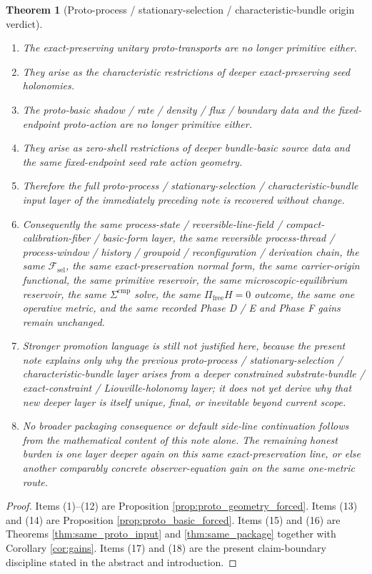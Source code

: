 \documentclass[11pt]{article}
\newcommand{\StemFunctional}{\mathscr F_{\mathrm{sel}}}
\newtheorem{theorem}{Theorem}
\begin{document}
\begin{theorem}[Proto-process / stationary-selection / characteristic-bundle origin verdict]
\begin{enumerate}
    \item The exact-preserving unitary proto-transports are no longer primitive either.
    \item They arise as the characteristic restrictions of deeper exact-preserving seed holonomies.
    \item The proto-basic shadow / rate / density / flux / boundary data and the fixed-endpoint proto-action are no longer primitive either.
    \item They arise as zero-shell restrictions of deeper bundle-basic source data and the same fixed-endpoint seed rate action geometry.
    \item Therefore the full proto-process / stationary-selection / characteristic-bundle input layer of the immediately preceding note is recovered without change.
    \item Consequently the same process-state / reversible-line-field / compact-calibration-fiber / basic-form layer, the same reversible process-thread / process-window / history / groupoid / reconfiguration / derivation chain, the same \(\StemFunctional\), the same exact-preservation normal form, the same carrier-origin functional, the same primitive reservoir, the same microscopic-equilibrium reservoir, the same \(\Sigma^{\mathrm{cmp}}\) solve, the same \(\Pi_{\mathrm{free}}H=0\) outcome, the same one operative metric, and the same recorded Phase D / E and Phase F gains remain unchanged.
    \item Stronger promotion language is still not justified here, because the present note explains only why the previous proto-process / stationary-selection / characteristic-bundle layer arises from a deeper constrained substrate-bundle / exact-constraint / Liouville-holonomy layer; it does not yet derive why that new deeper layer is itself unique, final, or inevitable beyond current scope.
    \item No broader packaging consequence or default side-line continuation follows from the mathematical content of this note alone. The remaining honest burden is one layer deeper again on this same exact-preservation line, or else another comparably concrete observer-equation gain on the same one-metric route.
\end{enumerate}
\end{theorem}

\begin{proof}
Items (1)--(12) are Proposition \ref{prop:proto_geometry_forced}. Items (13) and (14) are Proposition \ref{prop:proto_basic_forced}. Items (15) and (16) are Theorems \ref{thm:same_proto_input} and \ref{thm:same_package} together with Corollary \ref{cor:gains}. Items (17) and (18) are the present claim-boundary discipline stated in the abstract and introduction.
\end{proof}
\end{document}
